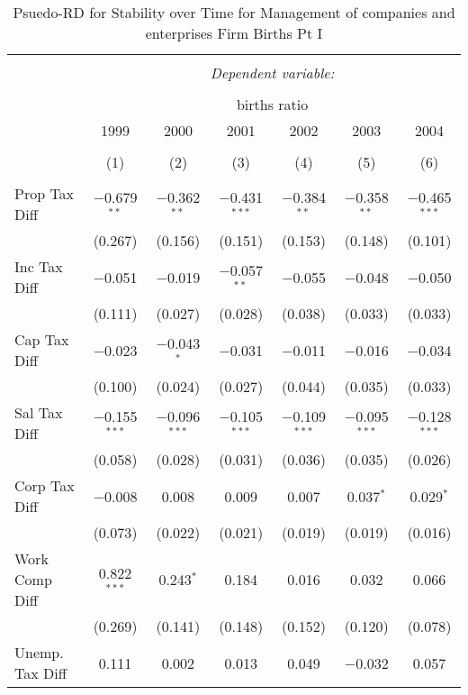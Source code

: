 
\begin{table}[!htbp] \centering 
  \caption{Psuedo-RD for Stability over Time for  Management of companies and enterprises Firm Births Pt I} 
  \label{55year} 
\small 
\begin{tabular}{@{\extracolsep{5pt}}lcccccc} 
\\[-1.8ex]\hline 
\hline \\[-1.8ex] 
 & \multicolumn{6}{c}{\textit{Dependent variable:}} \\ 
\cline{2-7} 
\\[-1.8ex] & \multicolumn{6}{c}{births ratio} \\ 
 & 1999 & 2000 & 2001 & 2002 & 2003 & 2004 \\ 
\\[-1.8ex] & (1) & (2) & (3) & (4) & (5) & (6)\\ 
\hline \\[-1.8ex] 
 Prop Tax Diff & $-$0.679$^{**}$ & $-$0.362$^{**}$ & $-$0.431$^{***}$ & $-$0.384$^{**}$ & $-$0.358$^{**}$ & $-$0.465$^{***}$ \\ 
  & (0.267) & (0.156) & (0.151) & (0.153) & (0.148) & (0.101) \\ 
  Inc Tax Diff & $-$0.051 & $-$0.019 & $-$0.057$^{**}$ & $-$0.055 & $-$0.048 & $-$0.050 \\ 
  & (0.111) & (0.027) & (0.028) & (0.038) & (0.033) & (0.033) \\ 
  Cap Tax Diff & $-$0.023 & $-$0.043$^{*}$ & $-$0.031 & $-$0.011 & $-$0.016 & $-$0.034 \\ 
  & (0.100) & (0.024) & (0.027) & (0.044) & (0.035) & (0.033) \\ 
  Sal Tax Diff & $-$0.155$^{***}$ & $-$0.096$^{***}$ & $-$0.105$^{***}$ & $-$0.109$^{***}$ & $-$0.095$^{***}$ & $-$0.128$^{***}$ \\ 
  & (0.058) & (0.028) & (0.031) & (0.036) & (0.035) & (0.026) \\ 
  Corp Tax Diff & $-$0.008 & 0.008 & 0.009 & 0.007 & 0.037$^{*}$ & 0.029$^{*}$ \\ 
  & (0.073) & (0.022) & (0.021) & (0.019) & (0.019) & (0.016) \\ 
  Work Comp Diff & 0.822$^{***}$ & 0.243$^{*}$ & 0.184 & 0.016 & 0.032 & 0.066 \\ 
  & (0.269) & (0.141) & (0.148) & (0.152) & (0.120) & (0.078) \\ 
  Unemp. Tax Diff & 0.111 & 0.002 & 0.013 & 0.049 & $-$0.032 & 0.057 \\ 

\end{tabular}
\end{table}
